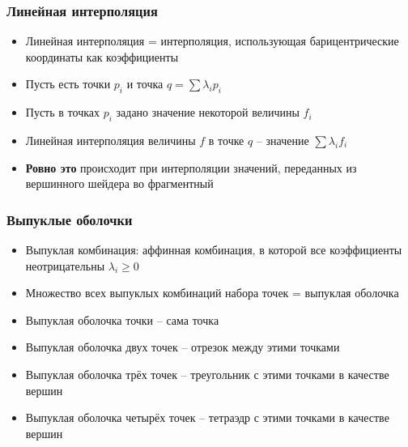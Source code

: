 \documentclass{beamer}
\begin{document}
\begin{frame}[fragile]
\frametitle{Линейная интерполяция}
\begin{itemize}
\item Линейная интерполяция = интерполяция, использующая барицентрические координаты как коэффициенты
\pause
\item Пусть есть точки \begin{math}p_i\end{math} и точка \begin{math}q = \sum \lambda_i p_i\end{math}
\pause
\item Пусть в точках \begin{math}p_i\end{math} задано значение некоторой величины \begin{math}f_i\end{math}
\pause
\item Линейная интерполяция величины \begin{math}f\end{math} в точке \begin{math}q\end{math} -- значение \begin{math}\sum \lambda_i f_i\end{math}
\pause
\item \textbf{Ровно это} происходит при интерполяции значений, переданных из вершинного шейдера во фрагментный
\end{itemize}
\end{frame}

\begin{frame}[fragile]
\frametitle{Выпуклые оболочки}
\begin{itemize}
\item Выпуклая комбинация: аффинная комбинация, в которой все коэффициенты неотрицательны \begin{math}\lambda_i \geq 0\end{math}
\pause
\item Множество всех выпуклых комбинаций набора точек = выпуклая оболочка
\pause
\item Выпуклая оболочка точки -- сама точка
\pause
\item Выпуклая оболочка двух точек -- отрезок между этими точками
\pause
\item Выпуклая оболочка трёх точек -- треугольник с этими точками в качестве вершин
\pause
\item Выпуклая оболочка четырёх точек -- тетраэдр с этими точками в качестве вершин
\end{itemize}
\end{frame}
\end{document}
